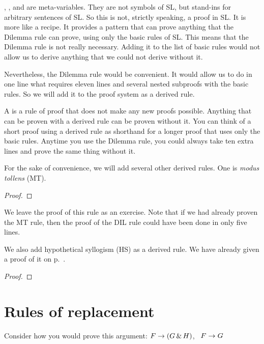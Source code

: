 , , and  are meta-variables. They are not symbols of SL, but stand-ins for arbitrary sentences of SL. So this is not, strictly speaking, a proof in SL. It is more like a recipe. It provides a pattern that can prove anything that the Dilemma rule can prove, using only the basic rules of SL. This means that the Dilemma rule is not really necessary. Adding it to the list of basic rules would not allow us to derive anything that we could not derive without it.

Nevertheless, the Dilemma rule would be convenient. It would allow us to do in one line what requires eleven lines and several nested subproofs with the basic rules. So we will add it to the proof system as a derived rule.

A  is a rule of proof that does not make any new proofs possible. Anything that can be proven with a derived rule can be proven without it. You can think of a short proof using a derived rule as shorthand for a longer proof that uses only the basic rules. Anytime you use the Dilemma rule, you could always take ten extra lines and prove the same thing without it.

For the sake of convenience, we will add several other derived rules. One is \emph{modus tollens} (MT).

\begin{proof}
	 
\end{proof}

We leave the proof of this rule as an exercise. Note that if we had already proven the MT rule, then the proof of the DIL rule could have been done in only five lines.

We also add hypothetical syllogism (HS) as a derived rule. We have already given a proof of it on p.~\pageref{HSproof}.

\begin{proof}
\end{proof}


\section{Rules of replacement}
Consider how you would prove this argument: $F\rightarrow(G\,\&\, H)$, \therefore\ $F\rightarrow G$

